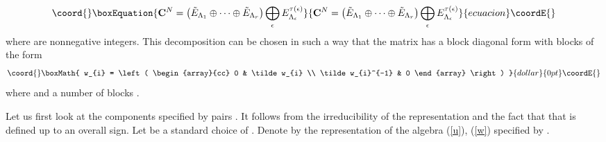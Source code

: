 \documentclass[a4paper,a4paper]{article}
\begin{document}
{\begin{equation}\coord{}\boxEquation{ \label{dec2}
{\bf C}^{N} = \left( \tilde E_{\Lambda_{1}} \oplus \dots \oplus \tilde E_{\Lambda_{r}}\right) \bigoplus_{\epsilon} E_{\Lambda_{\epsilon}}^{\tau (\epsilon )}
}{ {\bf C}^{N} = \left( \tilde E_{\Lambda_{1}} \oplus \dots \oplus \tilde E_{\Lambda_{r}}\right) \bigoplus_{\epsilon} E_{\Lambda_{\epsilon}}^{\tau (\epsilon )}
}{ecuacion}\coordE{}\end{equation} 
where \myHighlight{$\tau (\epsilon )$}\coordHE{} are nonnegative integers. 
This decomposition can be chosen in such a way that the  matrix \coordHE{} has a  block diagonal form 
with \coordHE{}  blocks \coordHE{} of the form  
$$\coord{}\boxMath{
 w_{i} = \left(
\begin{array}{cc} 0 & \tilde w_{i} \\ 
\tilde w_{i}^{-1} & 0 \end{array} \right) 
}{dollar}{0pt}\coordE{}$$
where \coordHE{} and a number of blocks \coordHE{}. 


Let us first look at the components specified by pairs  \coordHE{}. It follows from the irreducibility 
of the representation  \coordHE{} and the fact that \coordHE{} that \coordHE{} is defined up to an 
overall sign. Let \coordHE{} be  a standard choice of \coordHE{}. Denote by  \coordHE{} the representation 
of the algebra (\ref{u}), (\ref{w})  
specified by  \coordHE{}. 


}
\end{document}
